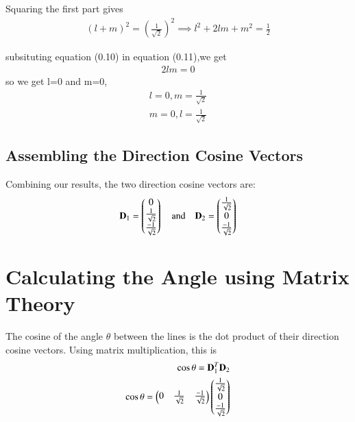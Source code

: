 \documentclass[journal]{IEEEtran}
\begin{document}
Squaring the first part gives
\begin{align}
(l+m)^2 = \left(\frac{1}{\sqrt{2}}\right)^2 \implies l^2+2lm+m^2 = \frac{1}{2}
\end{align}

subsituting equation (0.10) in equation (0.11),we get
\begin{align}
    2lm=0
\end{align}
so we get l=0 and m=0,
\begin{align}
      l=0, m = \frac{1}{\sqrt{2}}\\
      m=0,l = \frac{1}{\sqrt{2}}
\end{align}


\subsection{Assembling the Direction Cosine Vectors}
Combining our results, the two direction cosine vectors are:
\begin{align}    
\mathbf{D}_1 = \begin{pmatrix} 0 \\ \frac{1}{\sqrt{2}} \\ \frac{-1}{\sqrt{2}} \end{pmatrix} \quad \text{and} \quad \mathbf{D}_2 = \begin{pmatrix} \frac{1}{\sqrt{2}} \\ 0 \\ \frac{-1}{\sqrt{2}}\end{pmatrix}
\end{align}


\section{Calculating the Angle using Matrix Theory}
The cosine of the angle $\theta$ between the lines is the dot product of their direction cosine vectors. Using matrix multiplication, this is 
\begin{align}
\cos \theta = \mathbf{D}_1^T \mathbf{D}_2\\ 
\cos \theta = \begin{pmatrix} 0 & \frac{1}{\sqrt{2}} & \frac{-1}{\sqrt{2}}\end{pmatrix} \begin{pmatrix} \frac{1}{\sqrt{2}} \\ 0 \\ \frac{-1}{\sqrt{2}} \end{pmatrix}
\end{align}
\end{document}
